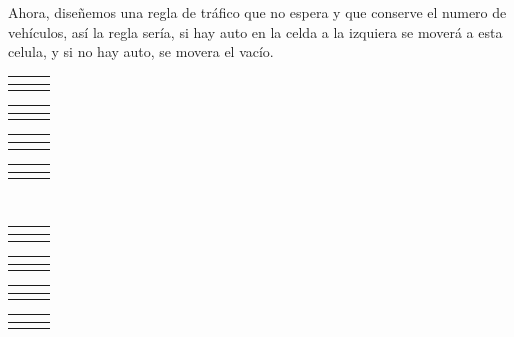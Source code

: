 \documentclass{article}
\begin{document}
\begin{enumerate}
Ahora, diseñemos una regla de tráfico que no espera y que conserve el numero de vehículos, así la regla sería, si hay auto en la celda a la izquiera se moverá a esta celula, y si no hay auto, se movera el vacío.\\
\begin{tabular}{c|c|c} %
  \hline
 \multicolumn{1}{|c|}{\cellcolor{gray}}&\cellcolor{gray}&\multicolumn{1}{c|}{\cellcolor{gray}}\\
  \hline
 & \cellcolor{gray} & \\
\cline{2-2}
\end{tabular}
\quad 
\begin{tabular}{c|c|c} %
  \hline
 \multicolumn{1}{|c|}{\cellcolor{gray}}&\cellcolor{gray}& \multicolumn{1}{c|}{}\\
  \hline
 & \cellcolor{gray} & \\
\cline{2-2}
\end{tabular}
\quad 
\begin{tabular}{c|c|c}%
  \hline
 \multicolumn{1}{|c|}{\cellcolor{gray}}& & \multicolumn{1}{c|}{\cellcolor{gray}}\\
  \hline
 & \cellcolor{gray}  & \\
\cline{2-2}
\end{tabular}
\quad
\begin{tabular}{c|c|c} %
  \hline
 \multicolumn{1}{|c|}{\cellcolor{gray}}& & \multicolumn{1}{c|}{ }  \\
  \hline
 & \cellcolor{gray} & \\
\cline{2-2}
\end{tabular}\\

\begin{tabular}{c|c|c} %
  \hline
 \multicolumn{1}{|c|}{ }&\cellcolor{gray} & \multicolumn{1}{c|}{\cellcolor{gray}}  \\
  \hline
 &  & \\
\cline{2-2}
\end{tabular}
\quad
\begin{tabular}{c|c|c}  %
  \hline
 \multicolumn{1}{|c|}{ }&\cellcolor{gray} & \multicolumn{1}{c|}{ }  \\
  \hline
 &  & \\
\cline{2-2}
\end{tabular}
\quad
\begin{tabular}{c|c|c} %
  \hline
 \multicolumn{1}{|c|}{ }&  & \multicolumn{1}{c|}{\cellcolor{gray}}  \\
  \hline
 &  & \\
\cline{2-2}
\end{tabular}
\quad
\begin{tabular}{c|c|c}  %
  \hline
 \multicolumn{1}{|c|}{ }&  & \multicolumn{1}{c|}{ }  \\
  \hline
 & & \\
\cline{2-2}
\end{tabular}


\end{enumerate}
\end{document}
